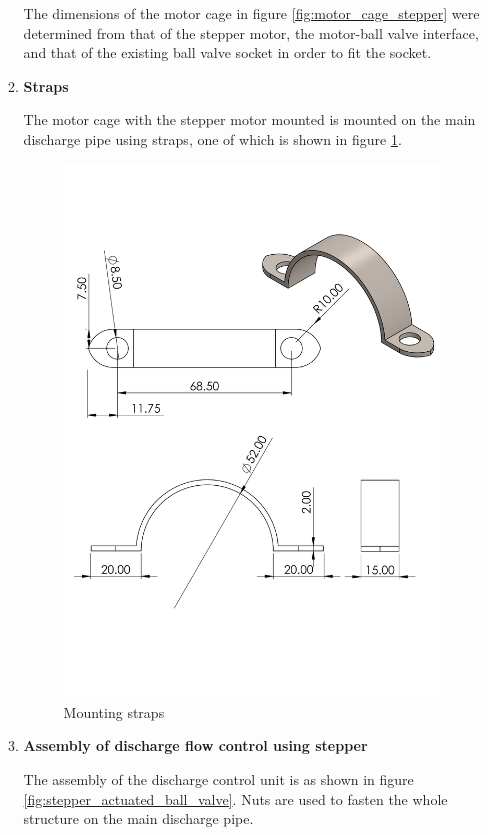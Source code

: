 \begin{enumerate}
\begin{enumerate}
    The dimensions of the motor cage in figure \ref{fig:motor_cage_stepper} were determined from that of the stepper motor, the motor-ball valve interface, and that of the existing ball valve socket in order to fit the socket.
    
    \item \textbf{Straps}
    \par
    The motor cage with the stepper motor mounted is mounted on the main discharge pipe using straps, one of which is shown in figure \ref{fig:mounting_straps_stepper}.
    
    \begin{figure}[H]
        \centering
        \includegraphics[height=.65\textheight]{Figures/strap.PNG}
        \caption{Mounting straps}
        \label{fig:mounting_straps_stepper}
    \end{figure}
 \item \textbf{Assembly of discharge flow control using stepper}
    \par
    The assembly of the discharge control unit is as shown in figure \ref{fig:stepper_actuated_ball_valve}. Nuts are used to fasten the whole structure on the main discharge pipe.
    

\end{enumerate}
\end{enumerate}
